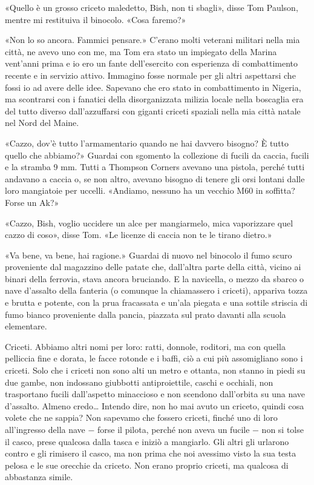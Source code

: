 «Quello è un grosso criceto maledetto, Bish, non ti sbagli», disse Tom
Paulson, mentre mi restituiva il binocolo. «Cosa faremo?»

«Non lo so ancora. Fammici pensare.» C'erano molti veterani militari
nella mia città, ne avevo uno con me, ma Tom era stato un impiegato
della Marina vent'anni prima e io ero un fante dell'esercito con
esperienza di combattimento recente e in servizio attivo. Immagino fosse
normale per gli altri aspettarsi che fossi io ad avere delle idee.
Sapevano che ero stato in combattimento in Nigeria, ma scontrarsi con i
fanatici della disorganizzata milizia locale nella boscaglia era del
tutto diverso dall'azzuffarsi con giganti criceti spaziali nella mia
città natale nel Nord del Maine.

«Cazzo, dov'è tutto l'armamentario quando ne hai davvero bisogno? È
tutto quello che abbiamo?» Guardai con sgomento la collezione di fucili
da caccia, fucili e la stramba 9 mm. Tutti a Thompson Corners avevano
una pistola, perché tutti andavano a caccia o, se non altro, avevano
bisogno di tenere gli orsi lontani dalle loro mangiatoie per uccelli.
«Andiamo, nessuno ha un vecchio M60 in soffitta? Forse un Ak?»

«Cazzo, Bish, voglio uccidere un alce per mangiarmelo, mica vaporizzare
quel cazzo di coso», disse Tom. «Le licenze di caccia non te le tirano
dietro.»

«Va bene, va bene, hai ragione.» Guardai di nuovo nel binocolo il fumo
scuro proveniente dal magazzino delle patate che, dall'altra parte della
città, vicino ai binari della ferrovia, stava ancora bruciando. E la
navicella, o mezzo da sbarco o nave d'assalto della fanteria (o comunque
la chiamassero i criceti), appariva tozza e brutta e potente, con la
prua fracassata e un'ala piegata e una sottile striscia di fumo bianco
proveniente dalla pancia, piazzata sul prato davanti alla scuola
elementare.

Criceti. Abbiamo altri nomi per loro: ratti, donnole, roditori, ma con
quella pelliccia fine e dorata, le facce rotonde e i baffi, ciò a cui
più assomigliano sono i criceti. Solo che i criceti non sono alti un
metro e ottanta, non stanno in piedi su due gambe, non indossano
giubbotti antiproiettile, caschi e occhiali, non trasportano fucili
dall'aspetto minaccioso e non scendono dall'orbita su una nave
d'assalto. Almeno credo\ldots{} Intendo dire, non ho mai avuto un
criceto, quindi cosa volete che ne sappia? Non sapevamo che fossero
criceti, finché uno di loro all'ingresso della nave − forse il pilota,
perché non aveva un fucile − non si tolse il casco, prese qualcosa dalla
tasca e iniziò a mangiarlo. Gli altri gli urlarono contro e gli rimisero
il casco, ma non prima che noi avessimo visto la sua testa pelosa e le
sue orecchie da criceto. Non erano proprio criceti, ma qualcosa di
abbastanza simile.

